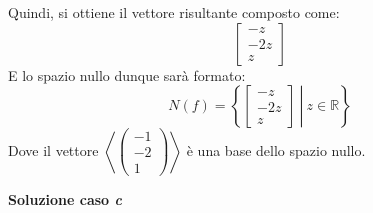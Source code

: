 \documentclass[a4paper]{article}
\begin{document}
	Quindi, si ottiene il vettore risultante composto come:
	\begin{equation*}
		\begin{bmatrix}
			-z \\
			-2z \\
			z
		\end{bmatrix}
	\end{equation*}
	E lo spazio nullo dunque sarà formato:
	\begin{equation*}
		N\left(f\right) = \left\{\left. \begin{bmatrix}
			-z \\
			-2z \\
			z
		\end{bmatrix} \: \right| \: z \in \mathbb{R}\right\}
	\end{equation*}
	Dove il vettore $\left\langle \begin{pmatrix}
		-1 \\
		-2 \\
		1
	\end{pmatrix}\right\rangle$ è una base dello spazio nullo.\newpage

	\noindent
	\textcolor{Green4}{\textbf{Soluzione caso \emph{c}}}\newline
	
\end{document}
